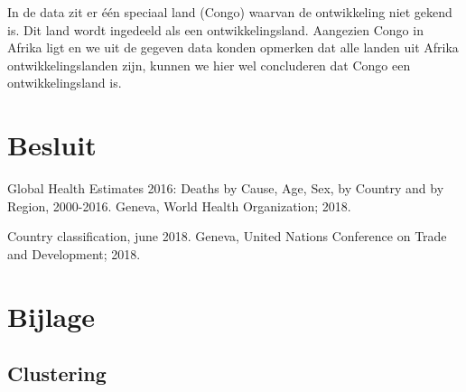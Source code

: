 \documentclass[a4paper,kulak]{kulakarticle}
\begin{document}
In de data zit er \'e\'en speciaal land (Congo) waarvan de ontwikkeling niet gekend is. Dit land wordt ingedeeld als een ontwikkelingsland. Aangezien Congo in Afrika ligt en we uit de gegeven data konden opmerken dat alle landen uit Afrika ontwikkelingslanden zijn, kunnen we hier wel concluderen dat Congo een ontwikkelingsland is. 

\section*{Besluit}



\begin{thebibliography}{9}
	
	Global Health Estimates 2016: Deaths by Cause, Age, Sex, by Country and by Region, 2000-2016.
	Geneva, World Health Organization; 2018.
	
	Country classification, june 2018. Geneva, United Nations Conference on Trade and Development;
	2018.
	
\end{thebibliography}

\newpage
\section{Bijlage} \label{b}
\subsection{Clustering}
\end{document}
